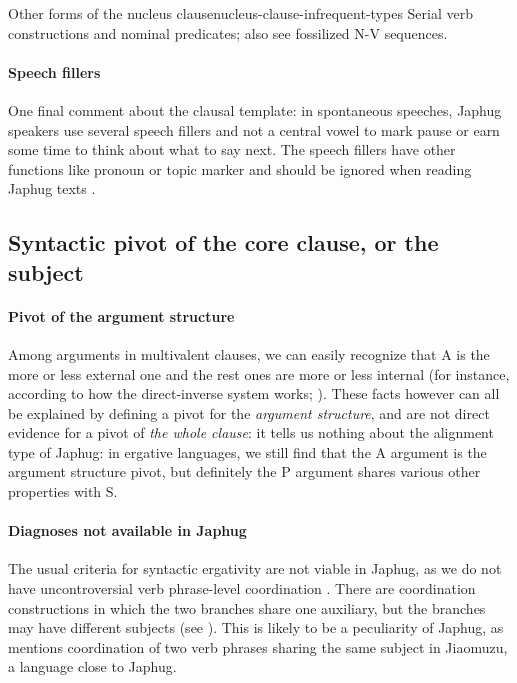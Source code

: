 \documentclass[a4paper, oneside, 12pt]{report}
\newcommand*{\citesec}[1]{\S~{#1}}
\newcommand*{\citepage}[1]{p.~{#1}}
\begin{document}
\begin{todobox}{Other forms of the nucleus clause}{nucleus-clause-infrequent-types}
    Serial verb constructions and nominal predicates;
    also see fossilized N-V sequences. 
\end{todobox}

\paragraph*{Speech fillers}
One final comment about the clausal template:
in spontaneous speeches, Japhug speakers use several speech fillers and not a central vowel 
to mark pause or earn some time to think about what to say next.
The speech fillers have other functions like pronoun or topic marker
and should be ignored when reading Japhug texts
\citep[\citesec{10.3}]{jacques2021grammar}.


\subsection{Syntactic pivot of the core clause, or the subject}\label{sec:grammatical.clause.subject}

\paragraph*{Pivot of the argument structure}
\label{sec:grammatical.clause.subject.argument-pivot}
Among arguments in multivalent clauses, we can easily recognize that 
A is the more or less external one
and the rest ones are more or less internal
(for instance, according to how the direct-inverse system works; ).
These facts however can all be explained by defining a pivot for the \emph{argument structure},
and are not direct evidence for a pivot of \emph{the whole clause}:
it tells us nothing about the alignment type of Japhug:
in ergative languages, we still find that the A argument is the argument structure pivot,
but definitely the P argument shares various other properties with S.

\paragraph*{Diagnoses not available in Japhug}
The usual criteria for syntactic ergativity are not viable in Japhug,
as we do not have uncontroversial verb phrase-level coordination \citep{jacques2014clause}.
There are coordination constructions in which the two branches share one auxiliary,
but the branches may have different subjects
(see ).
This is likely to be a peculiarity of Japhug,
as \citet[\citepage{549}]{prins2011web} mentions 
coordination of two verb phrases sharing the same subject
in Jiaomuzu, a language close to Japhug.
\end{document}
